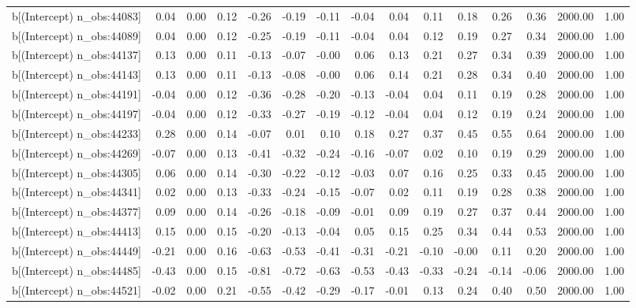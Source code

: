 \begin{table}[ht]
\begin{tabular}{rrrrrrrrrrrrrrr}
  b[(Intercept) n\_obs:44083] & 0.04 & 0.00 & 0.12 & -0.26 & -0.19 & -0.11 & -0.04 & 0.04 & 0.11 & 0.18 & 0.26 & 0.36 & 2000.00 & 1.00 \\ 
  b[(Intercept) n\_obs:44089] & 0.04 & 0.00 & 0.12 & -0.25 & -0.19 & -0.11 & -0.04 & 0.04 & 0.12 & 0.19 & 0.27 & 0.34 & 2000.00 & 1.00 \\ 
  b[(Intercept) n\_obs:44137] & 0.13 & 0.00 & 0.11 & -0.13 & -0.07 & -0.00 & 0.06 & 0.13 & 0.21 & 0.27 & 0.34 & 0.39 & 2000.00 & 1.00 \\ 
  b[(Intercept) n\_obs:44143] & 0.13 & 0.00 & 0.11 & -0.13 & -0.08 & -0.00 & 0.06 & 0.14 & 0.21 & 0.28 & 0.34 & 0.40 & 2000.00 & 1.00 \\ 
  b[(Intercept) n\_obs:44191] & -0.04 & 0.00 & 0.12 & -0.36 & -0.28 & -0.20 & -0.13 & -0.04 & 0.04 & 0.11 & 0.19 & 0.28 & 2000.00 & 1.00 \\ 
  b[(Intercept) n\_obs:44197] & -0.04 & 0.00 & 0.12 & -0.33 & -0.27 & -0.19 & -0.12 & -0.04 & 0.04 & 0.12 & 0.19 & 0.24 & 2000.00 & 1.00 \\ 
  b[(Intercept) n\_obs:44233] & 0.28 & 0.00 & 0.14 & -0.07 & 0.01 & 0.10 & 0.18 & 0.27 & 0.37 & 0.45 & 0.55 & 0.64 & 2000.00 & 1.00 \\ 
  b[(Intercept) n\_obs:44269] & -0.07 & 0.00 & 0.13 & -0.41 & -0.32 & -0.24 & -0.16 & -0.07 & 0.02 & 0.10 & 0.19 & 0.29 & 2000.00 & 1.00 \\ 
  b[(Intercept) n\_obs:44305] & 0.06 & 0.00 & 0.14 & -0.30 & -0.22 & -0.12 & -0.03 & 0.07 & 0.16 & 0.25 & 0.33 & 0.45 & 2000.00 & 1.00 \\ 
  b[(Intercept) n\_obs:44341] & 0.02 & 0.00 & 0.13 & -0.33 & -0.24 & -0.15 & -0.07 & 0.02 & 0.11 & 0.19 & 0.28 & 0.38 & 2000.00 & 1.00 \\ 
  b[(Intercept) n\_obs:44377] & 0.09 & 0.00 & 0.14 & -0.26 & -0.18 & -0.09 & -0.01 & 0.09 & 0.19 & 0.27 & 0.37 & 0.44 & 2000.00 & 1.00 \\ 
  b[(Intercept) n\_obs:44413] & 0.15 & 0.00 & 0.15 & -0.20 & -0.13 & -0.04 & 0.05 & 0.15 & 0.25 & 0.34 & 0.44 & 0.53 & 2000.00 & 1.00 \\ 
  b[(Intercept) n\_obs:44449] & -0.21 & 0.00 & 0.16 & -0.63 & -0.53 & -0.41 & -0.31 & -0.21 & -0.10 & -0.00 & 0.11 & 0.20 & 2000.00 & 1.00 \\ 
  b[(Intercept) n\_obs:44485] & -0.43 & 0.00 & 0.15 & -0.81 & -0.72 & -0.63 & -0.53 & -0.43 & -0.33 & -0.24 & -0.14 & -0.06 & 2000.00 & 1.00 \\ 
  b[(Intercept) n\_obs:44521] & -0.02 & 0.00 & 0.21 & -0.55 & -0.42 & -0.29 & -0.17 & -0.01 & 0.13 & 0.24 & 0.40 & 0.50 & 2000.00 & 1.00 \\ 

\end{tabular}
\end{table}
